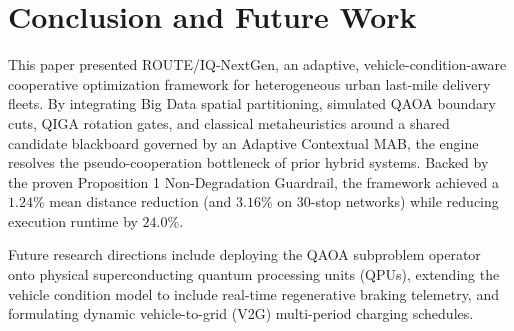 \section{Conclusion and Future Work}
\label{sec:conclusion}
This paper presented ROUTE/IQ-NextGen, an adaptive, vehicle-condition-aware cooperative optimization framework for heterogeneous urban last-mile delivery fleets. By integrating Big Data spatial partitioning, simulated QAOA boundary cuts, QIGA rotation gates, and classical metaheuristics around a shared candidate blackboard governed by an Adaptive Contextual MAB, the engine resolves the pseudo-cooperation bottleneck of prior hybrid systems. Backed by the proven Proposition 1 Non-Degradation Guardrail, the framework achieved a $1.24\%$ mean distance reduction (and $3.16\%$ on 30-stop networks) while reducing execution runtime by $24.0\%$.

Future research directions include deploying the QAOA subproblem operator onto physical superconducting quantum processing units (QPUs), extending the vehicle condition model to include real-time regenerative braking telemetry, and formulating dynamic vehicle-to-grid (V2G) multi-period charging schedules.
